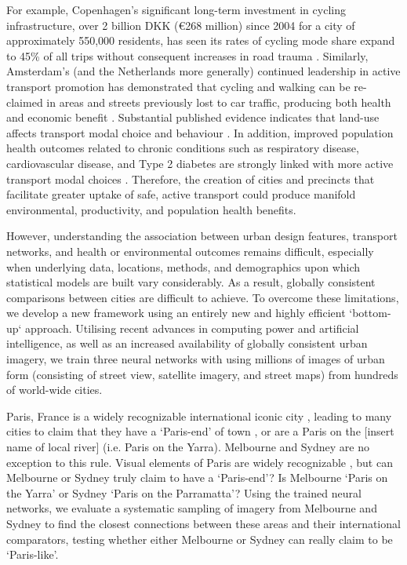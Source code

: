 \documentclass[sageh,times]{sagej}
\begin{document}
For example, Copenhagen's significant long-term investment in cycling infrastructure, over 2 billion DKK (\euro 268 million) since 2004 \citep{Copenhagen2017b} for a city of approximately 550,000 residents, has seen its rates of cycling mode share expand to 45\% of all trips without consequent increases in road trauma \citep{Kaplan2014}. Similarly, Amsterdam's (and the Netherlands more generally) continued leadership in active transport promotion has demonstrated that cycling and walking can be re-claimed in areas and streets previously lost to car traffic, producing both health and economic benefit \citep{Andersen2000}. Substantial published evidence indicates that land-use affects transport modal choice and behaviour  \citep{Giles-corti2016,Kleinert2016,Goenka2016}. In addition, improved population health outcomes related to chronic conditions such as respiratory disease, cardiovascular disease, and Type 2 diabetes are strongly linked with more active transport modal choices  \citep{Zapata-Diomedi2017}. Therefore, the creation of cities and precincts that facilitate greater uptake of safe, active transport could produce manifold environmental, productivity, and population health benefits. 

However, understanding the association between urban design features, transport networks, and health or environmental outcomes remains difficult, especially when underlying data, locations, methods, and demographics upon which statistical models are built vary considerably. As a result, globally consistent comparisons between cities are difficult to achieve. To overcome these limitations, we develop a new framework using an entirely new and highly efficient `bottom-up` approach. Utilising recent advances in computing power and artificial intelligence, as well as an increased availability of globally consistent urban imagery, we train three neural networks with using millions of images of urban form (consisting of street view, satellite imagery, and street maps) from hundreds of world-wide cities. 

Paris, France is a widely recognizable international iconic city \citep{Anholt2006}, leading to many cities to claim that they have a `Paris-end' of town \citep{Williams2010}, or are a Paris on the [insert name of local river] \citep{Wilden2013} (i.e. Paris on the Yarra). Melbourne and Sydney are no exception to this rule. Visual elements of Paris are widely recognizable \citep{Doersch2012}, but can Melbourne or Sydney truly claim to have a `Paris-end'? Is Melbourne `Paris on the Yarra' or Sydney `Paris on the Parramatta'? Using the trained neural networks, we evaluate a systematic sampling of imagery from Melbourne and Sydney to find the closest connections between these areas and their international comparators, testing whether either Melbourne or Sydney can really claim to be `Paris-like'.
\end{document}
